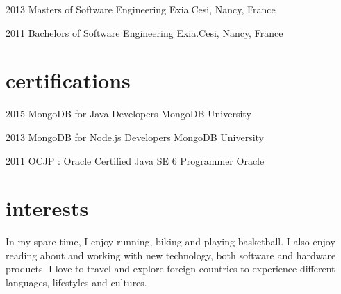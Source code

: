 \documentclass[]{friggeri-cv} %
\begin{document}
\begin{entrylist}


\entry
{2013}
{Masters {\normalfont of Software Engineering}}
{}
{Exia.Cesi, Nancy, France}
{}


\entry
{2011}
{Bachelors {\normalfont of Software Engineering}}
{}
{Exia.Cesi, Nancy, France}
{}


\end{entrylist}


\section{certifications}

\begin{entrylist}


\entry
{2015}
{MongoDB for Java Developers}
{MongoDB University}
{}
{}

\entry
{2013}
{MongoDB for Node.js Developers}
{MongoDB University}
{}
{}

\entry
{2011}
{OCJP : Oracle Certified Java SE 6 Programmer}
{Oracle}
{}
{}


\end{entrylist}


\section{interests}

In my spare time, I enjoy running, biking and playing basketball. I also enjoy reading about and working with new technology, both software and hardware products. I love to travel and explore foreign countries to experience different languages, lifestyles and cultures.
\end{document}
